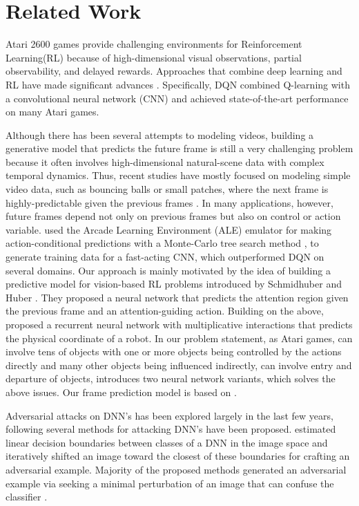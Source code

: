 \section{Related Work}

Atari 2600 games provide challenging environments for Reinforcement Learning(RL) because of high-dimensional visual observations, partial observability, and delayed rewards. Approaches that combine deep learning and RL have made significant advances \cite{one, two, three}. Specifically, DQN\cite{one} combined Q-learning \cite{four} with a convolutional neural network (CNN) and achieved state-of-the-art performance on many Atari games. 

Although there has been several attempts to modeling videos, building a generative model that predicts the future frame is still a very challenging problem because it often involves high-dimensional natural-scene data with complex temporal dynamics. Thus, recent studies have mostly focused on modeling simple video data, such as bouncing balls or small patches, where the next frame is highly-predictable given the previous frames \cite{fifteen, sixteen}. In many applications, however, future frames depend not only on previous frames but also on control or action variable. \cite{three} used the Arcade Learning Environment (ALE) emulator for making action-conditional predictions with a Monte-Carlo tree search method \cite{five}, to generate training data for a fast-acting CNN, which outperformed DQN on several domains. Our approach is mainly motivated by the idea of building a predictive model for vision-based RL problems introduced by Schmidhuber and Huber \cite{six}. They proposed a neural network that predicts the attention region given the previous frame and an attention-guiding action. Building on the above, \cite{seven} proposed a recurrent neural network with multiplicative interactions that predicts the physical coordinate of a robot. In our problem statement, as Atari games, can involve tens of objects with one or more objects being controlled by the actions directly and many other objects being influenced indirectly, can involve entry and departure of objects, \cite{eight} introduces two neural network variants, which solves the above issues. Our frame prediction model is based on \cite{eight}.

Adversarial attacks on DNN's has been explored largely in the last few years, following \cite{nine} several methods for attacking DNN's have been proposed.  \cite{12} estimated linear decision boundaries between classes of a DNN in the image space and iteratively shifted an image toward the closest of these boundaries for crafting an adversarial example. Majority of the proposed methods generated an adversarial example via seeking a minimal perturbation of an image that can confuse the classifier \cite{ten, eleven}. 

